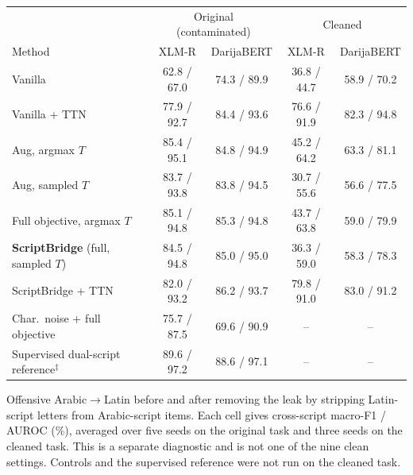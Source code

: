 \begin{lrbox}{\tblbox}\footnotesize\setlength{\tabcolsep}{3pt}%
\begin{tabular}{@{}lcccc@{}}
\toprule
 & \multicolumn{2}{c}{Original (contaminated)} & \multicolumn{2}{c}{Cleaned}\\
\cmidrule(lr){2-3}\cmidrule(lr){4-5}
Method & XLM-R & DarijaBERT & XLM-R & DarijaBERT\\
\midrule
Vanilla & 62.8 / 67.0 & 74.3 / 89.9 & 36.8 / 44.7 & 58.9 / 70.2\\
Vanilla + TTN & 77.9 / 92.7 & 84.4 / 93.6 & 76.6 / 91.9 & 82.3 / 94.8\\
Aug, argmax $T$ & 85.4 / 95.1 & 84.8 / 94.9 & 45.2 / 64.2 & 63.3 / 81.1\\
Aug, sampled $T$ & 83.7 / 93.8 & 83.8 / 94.5 & 30.7 / 55.6 & 56.6 / 77.5\\
Full objective, argmax $T$ & 85.1 / 94.8 & 85.3 / 94.8 & 43.7 / 63.8 & 59.0 / 79.9\\
\textbf{ScriptBridge} (full, sampled $T$) & 84.5 / 94.8 & 85.0 / 95.0 & 36.3 / 59.0 & 58.3 / 78.3\\
ScriptBridge + TTN & 82.0 / 93.2 & 86.2 / 93.7 & 79.8 / 91.0 & 83.0 / 91.2\\
Char.\ noise + full objective & 75.7 / 87.5 & 69.6 / 90.9 & -- & --\\
Supervised dual-script reference$^{\ddagger}$ & 89.6 / 97.2 & 88.6 / 97.1 & -- & --\\
\bottomrule
\end{tabular}%
\end{lrbox}
\begin{table}[t]
\caption{Offensive Arabic$\to$Latin before and after removing the leak by stripping Latin-script letters from Arabic-script items. Each cell gives cross-script macro-F1 / AUROC (\%), averaged over five seeds on the original task and three seeds on the cleaned task. This is a separate diagnostic and is not one of the nine clean settings. Controls and the supervised reference were not run on the cleaned task.}
\label{tab:clean}
\centering\footnotesize
\setlength{\tabcolsep}{3pt}
\fitbox{\linewidth}
\end{table}